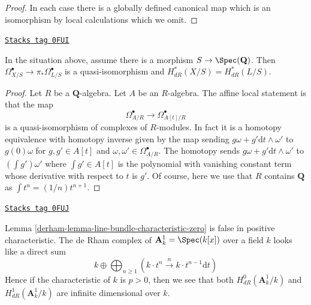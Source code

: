 \begin{proof}
In each case there is a globally defined canonical map which
is an isomorphism by local calculations which we omit.
\end{proof}

\begin{lemma}
\label{derham-lemma-line-bundle-characteristic-zero}
\href{https://stacks.math.columbia.edu/tag/0FUI}{\texttt{Stacks tag 0FUI}}

In the situation above, assume there is a morphism $S \to \Spec(\mathbf{Q})$.
Then $\Omega^\bullet_{X/S} \to \pi_*\Omega^\bullet_{L/S}$ is a
quasi-isomorphism and $H_{dR}^*(X/S) = H_{dR}^*(L/S)$.
\end{lemma}

\begin{proof}
Let $R$ be a $\mathbf{Q}$-algebra. Let $A$ be an $R$-algebra.
The affine local statement is that the map
$$
\Omega^\bullet_{A/R} \longrightarrow \Omega^\bullet_{A[t]/R}
$$
is a quasi-isomorphism of complexes of $R$-modules. In fact it is a
homotopy equivalence with homotopy inverse given by the map sending
$g \omega + g' \text{d}t \wedge \omega'$ to $g(0)\omega$ for
$g, g' \in A[t]$ and $\omega, \omega' \in \Omega^\bullet_{A/R}$.
The homotopy sends $g \omega + g' \text{d}t \wedge \omega'$
to $(\int g') \omega'$ where $\int g' \in A[t]$ is the polynomial
with vanishing constant term whose derivative with respect to $t$
is $g'$. Of course, here we use that $R$ contains $\mathbf{Q}$
as $\int t^n = (1/n)t^{n + 1}$.
\end{proof}

\begin{example}
\label{derham-example-affine-line}
\href{https://stacks.math.columbia.edu/tag/0FUJ}{\texttt{Stacks tag 0FUJ}}

Lemma \ref{derham-lemma-line-bundle-characteristic-zero} is
false in positive characteristic. The de Rham complex of
$\mathbf{A}^1_k = \Spec(k[x])$ over a field $k$ looks like a direct sum
$$
k \oplus
\bigoplus\nolimits_{n \geq 1}
(k \cdot t^n \xrightarrow{n}
k \cdot t^{n - 1} \text{d}t)
$$
Hence if the characteristic of $k$ is $p > 0$, then
we see that both $H^0_{dR}(\mathbf{A}^1_k/k)$ and
$H^1_{dR}(\mathbf{A}^1_k/k)$
are infinite dimensional over $k$.
\end{example}

